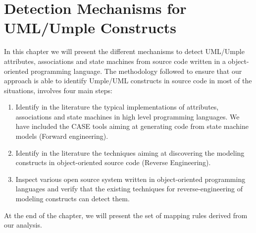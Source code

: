 \lhead{\emph{\leftmark}}  

\chapter{Detection Mechanisms for UML/Umple Constructs}
\label{chap:detections}
In this chapter we will present the different mechanisms to detect UML/Umple attributes, associations and state machines from source code written in a object-oriented programming language. The methodology followed to ensure that our approach is able to identify Umple/UML constructs in source code in most of the situations, involves four main steps:
\begin{enumerate}
\item 	Identify in the literature the typical implementations of attributes, associations and state machines in high level programming languages. We have included the CASE tools aiming at generating code from state machine models (Forward engineering).
\item 	Identify in the literature the techniques aiming at discovering the modeling constructs in object-oriented source code (Reverse Engineering).
\item 	Inspect various open source system written in object-oriented programming languages and verify that the existing techniques for reverse-engineering of modeling constructs can detect them.
\end{enumerate}
At the end of the chapter, we will present the set of mapping rules derived from our analysis. 

